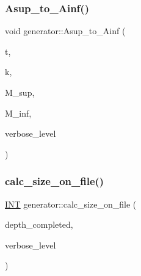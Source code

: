 \subsubsection{\texorpdfstring{Asup\+\_\+to\+\_\+\+Ainf()}{Asup\_to\_Ainf()}}
{\footnotesize\ttfamily void generator\+::\+Asup\+\_\+to\+\_\+\+Ainf (\begin{DoxyParamCaption}\item[{\mbox{\hyperlink{galois_8h_a09fddde158a3a20bd2dcadb609de11dc}{I\+NT}}}]{t,  }\item[{\mbox{\hyperlink{galois_8h_a09fddde158a3a20bd2dcadb609de11dc}{I\+NT}}}]{k,  }\item[{\mbox{\hyperlink{galois_8h_a09fddde158a3a20bd2dcadb609de11dc}{I\+NT}} $\ast$}]{M\+\_\+sup,  }\item[{\mbox{\hyperlink{galois_8h_a09fddde158a3a20bd2dcadb609de11dc}{I\+NT}} $\ast$}]{M\+\_\+inf,  }\item[{\mbox{\hyperlink{galois_8h_a09fddde158a3a20bd2dcadb609de11dc}{I\+NT}}}]{verbose\+\_\+level }\end{DoxyParamCaption})}

\mbox{\label{classgenerator_a1bd76c85ca19d820817c725ac71ed1b3}} 
\subsubsection{\texorpdfstring{calc\+\_\+size\+\_\+on\+\_\+file()}{calc\_size\_on\_file()}}
{\footnotesize\ttfamily \mbox{\hyperlink{galois_8h_a09fddde158a3a20bd2dcadb609de11dc}{I\+NT}} generator\+::calc\+\_\+size\+\_\+on\+\_\+file (\begin{DoxyParamCaption}\item[{\mbox{\hyperlink{galois_8h_a09fddde158a3a20bd2dcadb609de11dc}{I\+NT}}}]{depth\+\_\+completed,  }\item[{\mbox{\hyperlink{galois_8h_a09fddde158a3a20bd2dcadb609de11dc}{I\+NT}}}]{verbose\+\_\+level }\end{DoxyParamCaption})}

\mbox{\label{classgenerator_a8701aa1c97fa3c67a483ec2cfaf45476}} 
